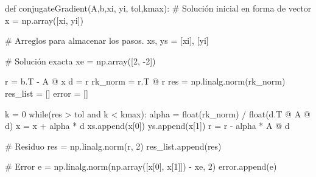\documentclass[
  letterpaper,
  DIV=11,
  numbers=noendperiod]{scrreprt}
\newenvironment{Shaded}{\begin{snugshade}}{\end{snugshade}}
\newcommand{\BuiltInTok}[1]{\textcolor[rgb]{0.00,0.23,0.31}{#1}}
\newcommand{\CommentTok}[1]{\textcolor[rgb]{0.37,0.37,0.37}{#1}}
\newcommand{\ControlFlowTok}[1]{\textcolor[rgb]{0.00,0.23,0.31}{#1}}
\newcommand{\DecValTok}[1]{\textcolor[rgb]{0.68,0.00,0.00}{#1}}
\newcommand{\KeywordTok}[1]{\textcolor[rgb]{0.00,0.23,0.31}{#1}}
\newcommand{\NormalTok}[1]{\textcolor[rgb]{0.00,0.23,0.31}{#1}}
\newcommand{\OperatorTok}[1]{\textcolor[rgb]{0.37,0.37,0.37}{#1}}
\begin{document}
\begin{Shaded}
\begin{Highlighting}[]
\KeywordTok{def}\NormalTok{ conjugateGradient(A,b,xi, yi, tol,kmax):}
    \CommentTok{\# Solución inicial en forma de vector}
\NormalTok{    x }\OperatorTok{=}\NormalTok{ np.array([xi, yi]) }
    
    \CommentTok{\# Arreglos para almacenar los pasos.}
\NormalTok{    xs, ys }\OperatorTok{=}\NormalTok{ [xi], [yi]}
    
    \CommentTok{\# Solución exacta}
\NormalTok{    xe }\OperatorTok{=}\NormalTok{ np.array([}\DecValTok{2}\NormalTok{, }\OperatorTok{{-}}\DecValTok{2}\NormalTok{]) }

\NormalTok{    r }\OperatorTok{=}\NormalTok{ b.T }\OperatorTok{{-}}\NormalTok{ A }\OperatorTok{@}\NormalTok{ x}
\NormalTok{    d }\OperatorTok{=}\NormalTok{ r}
\NormalTok{    rk\_norm }\OperatorTok{=}\NormalTok{ r.T }\OperatorTok{@}\NormalTok{ r}
\NormalTok{    res }\OperatorTok{=}\NormalTok{ np.linalg.norm(rk\_norm)}
\NormalTok{    res\_list }\OperatorTok{=}\NormalTok{ []}
\NormalTok{    error }\OperatorTok{=}\NormalTok{ [] }

\NormalTok{    k }\OperatorTok{=} \DecValTok{0}
    \ControlFlowTok{while}\NormalTok{(res }\OperatorTok{\textgreater{}}\NormalTok{ tol }\KeywordTok{and}\NormalTok{ k }\OperatorTok{\textless{}}\NormalTok{ kmax):}
\NormalTok{        alpha }\OperatorTok{=} \BuiltInTok{float}\NormalTok{(rk\_norm) }\OperatorTok{/} \BuiltInTok{float}\NormalTok{(d.T }\OperatorTok{@}\NormalTok{ A }\OperatorTok{@}\NormalTok{ d)}
\NormalTok{        x }\OperatorTok{=}\NormalTok{ x }\OperatorTok{+}\NormalTok{ alpha }\OperatorTok{*}\NormalTok{ d}
\NormalTok{        xs.append(x[}\DecValTok{0}\NormalTok{])}
\NormalTok{        ys.append(x[}\DecValTok{1}\NormalTok{])}
\NormalTok{        r }\OperatorTok{=}\NormalTok{ r }\OperatorTok{{-}}\NormalTok{ alpha }\OperatorTok{*}\NormalTok{ A }\OperatorTok{@}\NormalTok{ d}
        
        \CommentTok{\# Residuo}
\NormalTok{        res }\OperatorTok{=}\NormalTok{ np.linalg.norm(r, }\DecValTok{2}\NormalTok{)}
\NormalTok{        res\_list.append(res)}

        \CommentTok{\# Error}
\NormalTok{        e }\OperatorTok{=}\NormalTok{ np.linalg.norm(np.array([x[}\DecValTok{0}\NormalTok{], x[}\DecValTok{1}\NormalTok{]]) }\OperatorTok{{-}}\NormalTok{ xe, }\DecValTok{2}\NormalTok{)}
\NormalTok{        error.append(e)}
        

\end{Highlighting}
\end{Shaded}
\end{document}
